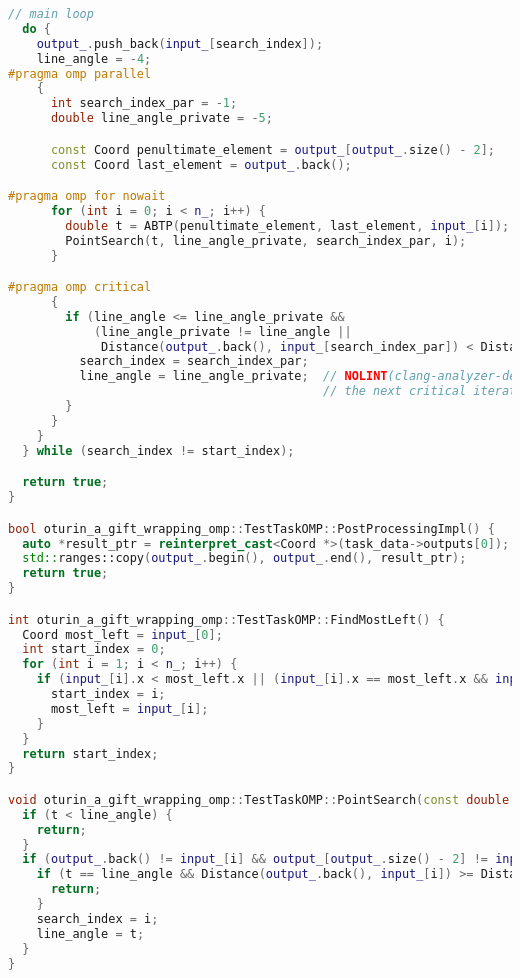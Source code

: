 \documentclass[12pt,a4paper]{extarticle}
\begin{document}
\begin{lstlisting}[language=C++]
  // main loop
  do {
    output_.push_back(input_[search_index]);
    line_angle = -4;
#pragma omp parallel
    {
      int search_index_par = -1;
      double line_angle_private = -5;

      const Coord penultimate_element = output_[output_.size() - 2];
      const Coord last_element = output_.back();

#pragma omp for nowait
      for (int i = 0; i < n_; i++) {
        double t = ABTP(penultimate_element, last_element, input_[i]);
        PointSearch(t, line_angle_private, search_index_par, i);
      }

#pragma omp critical
      {
        if (line_angle <= line_angle_private &&
            (line_angle_private != line_angle ||
             Distance(output_.back(), input_[search_index_par]) < Distance(output_.back(), input_[search_index]))) {
          search_index = search_index_par;
          line_angle = line_angle_private;  // NOLINT(clang-analyzer-deadcode.DeadStores): line_angle will be read in
                                            // the next critical iteration
        }
      }
    }
  } while (search_index != start_index);

  return true;
}

bool oturin_a_gift_wrapping_omp::TestTaskOMP::PostProcessingImpl() {
  auto *result_ptr = reinterpret_cast<Coord *>(task_data->outputs[0]);
  std::ranges::copy(output_.begin(), output_.end(), result_ptr);
  return true;
}

int oturin_a_gift_wrapping_omp::TestTaskOMP::FindMostLeft() {
  Coord most_left = input_[0];
  int start_index = 0;
  for (int i = 1; i < n_; i++) {
    if (input_[i].x < most_left.x || (input_[i].x == most_left.x && input_[i].y > most_left.y)) {
      start_index = i;
      most_left = input_[i];
    }
  }
  return start_index;
}

void oturin_a_gift_wrapping_omp::TestTaskOMP::PointSearch(const double t, double &line_angle, int &search_index, const int i) {
  if (t < line_angle) {
    return;
  }
  if (output_.back() != input_[i] && output_[output_.size() - 2] != input_[i]) {
    if (t == line_angle && Distance(output_.back(), input_[i]) >= Distance(output_.back(), input_[search_index])) {
      return;
    }
    search_index = i;
    line_angle = t;
  }
}
\end{lstlisting}
\end{document}
